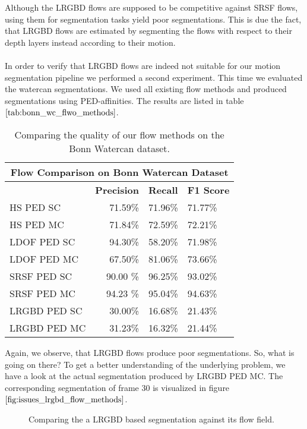 Although the LRGBD flows are supposed to be competitive against SRSF flows, using them for segmentation tasks yield poor segmentations. This is due the fact, that LRGBD flows are estimated by segmenting the flows with respect to their depth layers instead according to their motion. \\ \\

In order to verify that LRGBD flows are indeed not suitable for our motion segmentation pipeline we performed a second experiment. This time we evaluated the watercan segmentations. We used all existing flow methods and produced segmentations using PED-affinities. The results are listed in table $\ref{tab:bonn_wc_flwo_methods}$.
\begin{table}[H]
\centering
\begin{tabular}{|l|r|l|l|}
\hline
\multicolumn{4}{|c|}{Flow Comparison on Bonn Watercan Dataset} \\ \hline
& \textbf{Precision} & \textbf{Recall} & \textbf{F1 Score} \\ \hline            
HS PED SC  & 71.59\%   & 71.96\%     & 71.77\%  \\ \hline
HS PED MC  & 71.84\%   & 72.59\%     & 72.21\%  \\ \hline                        
LDOF PED SC  & 94.30\%   & 58.20\%     & 71.98\%  \\ \hline
LDOF PED MC  & 67.50\%   & 81.06\%     & 73.66\%  \\ \hline
SRSF PED SC & 90.00 \%   & 96.25\%     & 93.02\%  \\ \hline
SRSF PED MC & 94.23 \%   & 95.04\%     & 94.63\%  \\ \hline
LRGBD PED SC & 30.00\%   & 16.68\%     & 21.43\%  \\ \hline
LRGBD PED MC & 31.23\%   & 16.32\%     & 21.44\%  \\ \hline
\end{tabular}
\caption[Flow Method Comparission Bonn Watercan]{Comparing the quality of our flow methods on the Bonn Watercan dataset.}
\label{tab:bonn_wc_flwo_methods}
\end{table}
Again, we observe, that LRGBD flows produce poor segmentations. So, what is going on there? To get a better understanding of the underlying problem, we have a look at the actual segmentation produced by LRGBD PED MC. The corresponding segmentation of frame 30 is visualized in figure $\ref{fig:issues_lrgbd_flow_methods}$. 
\begin{figure}[H]
\begin{center}
\end{center}
\caption[Issue with LRGBD Flows]{Comparing the a LRGBD based segmentation against its flow field.}
\label{fig:issues_lrgbd_flow_methods}
\end{figure}
